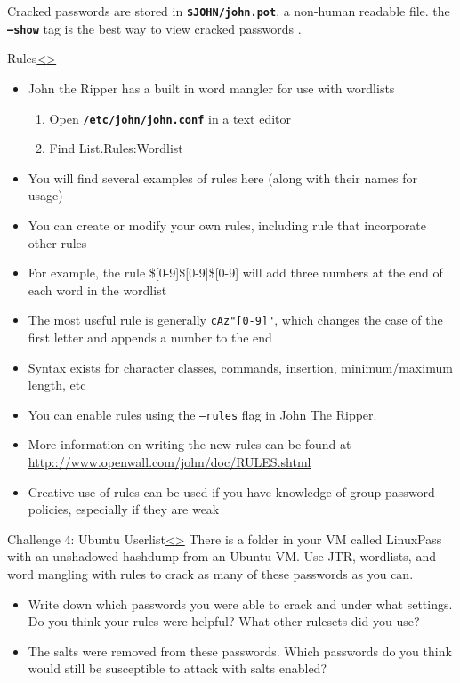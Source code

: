 \documentclass[12pt]{article}
\newcommand{\code}[1]{\texttt{\bfseries#1}}
\newenvironment{instructionblock}{\Large\bgroup}{\egroup}
\newcommand{\bi}{\begin{itemize}}
\newcommand{\ei}{\end{itemize}}
\begin{document}
Cracked passwords are stored in \code{\$JOHN/john.pot}, a non-human readable file. the \code{--show} tag is the best way to view cracked passwords \cite{john}.

\pagebreak
\begin{slide}{Rules}{\hyperref[slide 19]{\textless}\hyperref[slide 21]{\textgreater}}
	\begin{instructionblock}
		\bi
			\item John the Ripper has a built in word mangler for use with wordlists
			\begin{enumerate}
				\item Open \code{/etc/john/john.conf} in a text editor
				\item Find List.Rules:Wordlist
			\end{enumerate}
			\item You will find several examples of rules here (along with their names for usage)
			\item You can create or modify your own rules, including rule that incorporate other rules
		\ei
	\end{instructionblock}
\end{slide}
	\bi
		\item For example, the rule \$[0-9]\$[0-9]\$[0-9] will add three
	numbers at the end of each word in the wordlist
		\item The most useful rule is generally \texttt{cAz"[0-9]"}, which changes the case of the first letter and appends a number to the end
		\item Syntax exists for character classes, commands, insertion, minimum/maximum length, etc
		\item You can enable rules using the \texttt{--rules} flag in John The Ripper.
		\item More information on writing the new rules can be found at \url{http:://www.openwall.com/john/doc/RULES.shtml}
		\item Creative use of rules can be used if you have knowledge of group password policies, especially if they are weak
	\ei
\vfill
	\cite{book}
\pagebreak
\begin{slide}{Challenge 4: Ubuntu Userlist}{\hyperref[slide 20]{\textless}\hyperref[slide 22]{\textgreater}}
	\begin{instructionblock}
		There is a folder in your VM called LinuxPass with an unshadowed hashdump from an Ubuntu VM. Use JTR, wordlists, and word mangling with rules to crack as many of these passwords as you can.
		\bi
			\item Write down which passwords you were able to crack and under what settings. Do you think your rules were helpful? What other rulesets did you use?
			\item The salts were removed from these passwords. Which passwords do you think would still be susceptible to attack with salts enabled?
		\ei
	\end{instructionblock}
\end{slide}
\end{document}
